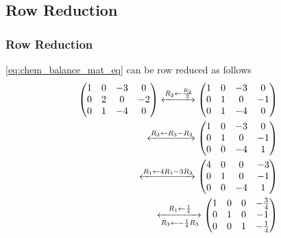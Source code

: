 \documentclass{beamer}
\theoremstyle{remark}
\providecommand{\norm}[1]{\lVert#1\rVert}
\newcommand{\myvec}[1]{\ensuremath{\begin{pmatrix}#1\end{pmatrix}}}
\numberwithin{equation}{section}
\begin{document}
\subsection{Row Reduction}
\begin{frame}
\frametitle{Row Reduction}
\eqref{eq:chem_balance_mat_eq} can be row reduced as follows
%
\begin{align}
\label{eq:chem_balance_mat_row}
\myvec{
1 & 0 & -3 & 0
\\
0 & 2 & 0 & -2
\\
0 & 1 & -4 & 0
}
 \xleftrightarrow[]{R_2 \leftarrow \frac{R_2}{2}}
\myvec{
1 & 0 & -3 & 0
\\
0 & 1 & 0 & -1
\\
0 & 1 & -4 & 0
}
\\
 \xleftrightarrow[]{R_3\leftarrow R_3-R_2}
\myvec{
1 & 0 & -3 & 0
\\
0 & 1 & 0 & -1
\\
0 & 0 & -4 & 1
}
\\
 \xleftrightarrow[]{R_1\leftarrow 4R_1-3R_3}
\myvec{
4 & 0 & 0 & -3
\\
0 & 1 & 0 & -1
\\
0 & 0 & -4 & 1
}
\\
 \xleftrightarrow[R_3 \leftarrow -\frac{1}{4}R_3]{R_1\leftarrow \frac{1}{4}}
\myvec{
1 & 0 & 0 & -\frac{3}{4}
\\
0 & 1 & 0 & -1
\\
0 & 0 & 1 & -\frac{1}{4}
}
\end{align}
%
\end{frame}
\end{document}
